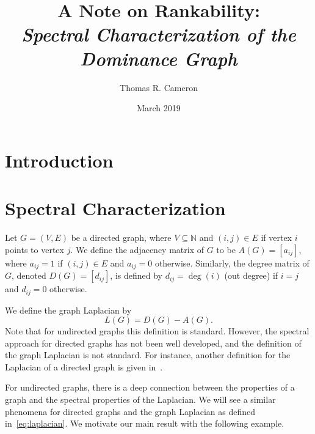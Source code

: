 \documentclass{article}
\title{A Note on Rankability:\\
\emph{\large{Spectral Characterization of the Dominance Graph}}}
\author{Thomas R. Cameron}
\date{March 2019}
\begin{document}
\maketitle
{}

\section{Introduction}	

\section{Spectral Characterization}
Let $G=(V,E)$ be a directed graph, where $V\subseteq\mathbb{N}$ and $(i,j)\in E$ if vertex $i$ points to vertex $j$.
We define the adjacency matrix of $G$ to be $A(G)=[a_{ij}]$, where $a_{ij}=1$ if $(i,j)\in E$ and $a_{ij}=0$ otherwise. 
Similarly, the degree matrix of $G$, denoted $D(G)=[d_{ij}]$, is defined by $d_{ij}=\deg(i)$ (out degree) if $i=j$ and $d_{ij}=0$ otherwise.

We define the graph Laplacian by 
\begin{equation}\label{eq:laplacian}
L(G)=D(G)-A(G).
\end{equation}
Note that for undirected graphs this definition is standard. 
However, the spectral approach for directed graphs has not been well developed, and the definition of the graph Laplacian is not standard.
For instance, another definition for the Laplacian of a directed graph is given in~\cite{Chung2005}.

For undirected graphs, there is a deep connection between the properties of a graph and the spectral properties of the Laplacian. 
We will see a similar phenomena for directed graphs and the graph Laplacian as defined in~\eqref{eq:laplacian}.
We motivate our main result with the following example.
\end{document}
